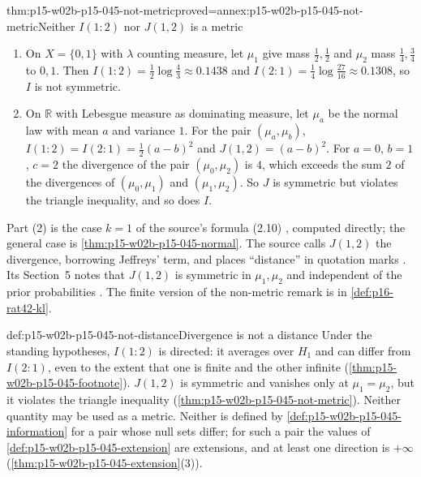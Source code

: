 \begin{hbtheorem}{thm:p15-w02b-p15-045-not-metric}{proved=annex:p15-w02b-p15-045-not-metric}{Neither \(I(1:2)\) nor \(J(1,2)\) is a metric}
\begin{enumerate}
\item On \(X=\{0,1\}\) with \(\lambda\) counting measure, let \(\mu_1\)
give mass \(\tfrac12,\tfrac12\) and \(\mu_2\) mass
\(\tfrac14,\tfrac34\) to \(0,1\). Then
\(I(1:2)=\tfrac12\log\tfrac43\approx0.1438\) and
\(I(2:1)=\tfrac14\log\tfrac{27}{16}\approx0.1308\), so \(I\) is not
symmetric.
\item On \(\mathbb R\) with Lebesgue measure as dominating measure, let
\(\mu_a\) be the normal law with mean \(a\) and variance \(1\). For the
pair \((\mu_a,\mu_b)\), \(I(1:2)=I(2:1)=\tfrac12(a-b)^2\) and
\(J(1,2)=(a-b)^2\). For \(a=0\), \(b=1\), \(c=2\) the divergence of the
pair \((\mu_0,\mu_2)\) is \(4\), which exceeds the sum \(2\) of the
divergences of \((\mu_0,\mu_1)\) and \((\mu_1,\mu_2)\). So \(J\) is
symmetric but violates the triangle inequality, and so does \(I\).
\end{enumerate}
\end{hbtheorem}

Part (2) is the case \(k=1\) of the source's formula (2.10)
\cite[p.~81]{KullbackLeibler1951Information}, computed directly; the
general case is \cref{thm:p15-w02b-p15-045-normal}. The
source calls \(J(1,2)\) the divergence, borrowing Jeffreys' term, and
places ``distance'' in quotation marks
\cite[pp.~79 and~81]{KullbackLeibler1951Information}. Its Section~5
notes that \(J(1,2)\) is symmetric in \(\mu_1,\mu_2\) and independent of
the prior probabilities \cite[p.~85]{KullbackLeibler1951Information}. The
finite version of the non-metric remark is in \cref{def:p16-rat42-kl}.

\begin{hbwarning}{def:p15-w02b-p15-045-not-distance}{Divergence is not a distance}
Under the standing hypotheses, \(I(1:2)\) is directed: it averages over
\(H_1\) and can differ from \(I(2:1)\), even to the extent that one is
finite and the other infinite (\cref{thm:p15-w02b-p15-045-footnote}).
\(J(1,2)\) is symmetric and vanishes only at \(\mu_1=\mu_2\), but it
violates the triangle inequality (\cref{thm:p15-w02b-p15-045-not-metric}).
Neither quantity may be used as a metric. Neither is defined by
\cref{def:p15-w02b-p15-045-information} for a pair whose null sets
differ; for such a pair the values of
\cref{def:p15-w02b-p15-045-extension} are extensions, and at least one
direction is \(+\infty\) (\cref{thm:p15-w02b-p15-045-extension}(3)).
\end{hbwarning}

